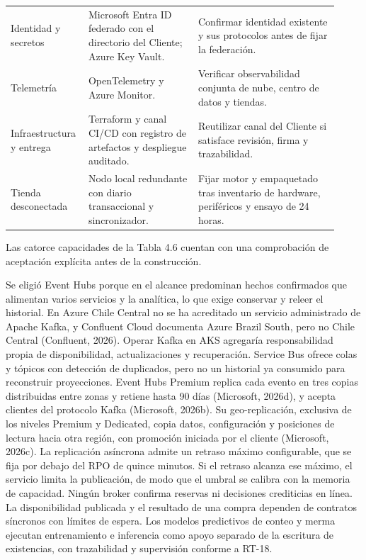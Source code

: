 \documentclass[11pt]{article}
\begin{document}
\begin{longtable}{@{}p{0.19\linewidth}p{0.32\linewidth}p{0.41\linewidth}@{}}
Identidad y secretos & Microsoft Entra ID federado con el directorio del Cliente; Azure Key Vault. & Confirmar identidad existente y sus protocolos antes de fijar la federación. \\
Telemetría & OpenTelemetry y Azure Monitor. & Verificar observabilidad conjunta de nube, centro de datos y tiendas. \\
Infraestructura y entrega & Terraform y canal CI/CD con registro de artefactos y despliegue auditado. & Reutilizar canal del Cliente si satisface revisión, firma y trazabilidad. \\
Tienda desconectada & Nodo local redundante con diario transaccional y sincronizador. & Fijar motor y empaquetado tras inventario de hardware, periféricos y ensayo de 24 horas. \\
\end{longtable}

Las catorce capacidades de la Tabla 4.6 cuentan con una comprobación de aceptación explícita antes de la construcción.

Se eligió Event Hubs porque en el alcance predominan hechos confirmados que alimentan varios servicios y la analítica, lo que exige conservar y releer el historial. En Azure Chile Central no se ha acreditado un servicio administrado de Apache Kafka, y Confluent Cloud documenta Azure Brazil South, pero no Chile Central (Confluent, 2026). Operar Kafka en AKS agregaría responsabilidad propia de disponibilidad, actualizaciones y recuperación. Service Bus ofrece colas y tópicos con detección de duplicados, pero no un historial ya consumido para reconstruir proyecciones. Event Hubs Premium replica cada evento en tres copias distribuidas entre zonas y retiene hasta 90 días (Microsoft, 2026d), y acepta clientes del protocolo Kafka (Microsoft, 2026b). Su geo-replicación, exclusiva de los niveles Premium y Dedicated, copia datos, configuración y posiciones de lectura hacia otra región, con promoción iniciada por el cliente (Microsoft, 2026c). La replicación asíncrona admite un retraso máximo configurable, que se fija por debajo del RPO de quince minutos. Si el retraso alcanza ese máximo, el servicio limita la publicación, de modo que el umbral se calibra con la memoria de capacidad. Ningún broker confirma reservas ni decisiones crediticias en línea. La disponibilidad publicada y el resultado de una compra dependen de contratos síncronos con límites de espera. Los modelos predictivos de conteo y merma ejecutan entrenamiento e inferencia como apoyo separado de la escritura de existencias, con trazabilidad y supervisión conforme a RT-18.
\end{document}
